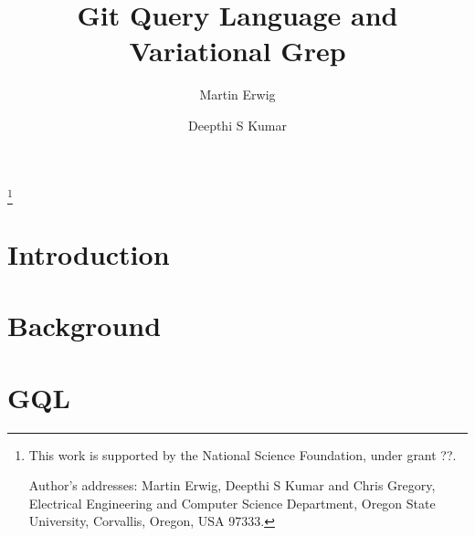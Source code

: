 \documentclass[acmlarge,review,anonymous]{acmart}\settopmatter{printfolios=true}
\begin{document}

\title{Git Query Language and Variational Grep}
\author{Martin Erwig}
\author{Deepthi S Kumar}

    \begin{abstract}
    \end{abstract}


\thanks{This work is supported by the National Science Foundation,
  under grant ??.%

  Author's addresses: Martin Erwig, Deepthi S Kumar {and} Chris Gregory, Electrical Engineering and Computer Science Department, Oregon State University, Corvallis, Oregon, USA 97333.}

  \maketitle
    
    \section{Introduction}\label{sec:intro}
    
         
    \section{Background}\label{sec:back}
    
    
    
    \section{GQL}\label{sec:gitql}
    
   
\end{document}
